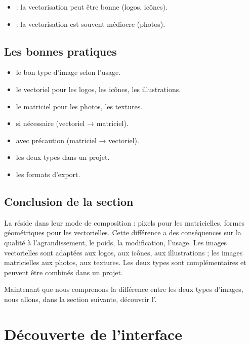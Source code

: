 \begin{itemize}
    \item {} : la vectorisation peut être bonne (logos, icônes).
    \item {} : la vectorisation est souvent médiocre (photos).
\end{itemize}

\subsection{Les bonnes pratiques}

\begin{itemize}
    \item {} le bon type d'image selon l'usage.
    \item {} le vectoriel pour les logos, les icônes, les illustrations.
    \item {} le matriciel pour les photos, les textures.
    \item {} si nécessaire (vectoriel → matriciel).
    \item {} avec précaution (matriciel → vectoriel).
    \item {} les deux types dans un projet.
    \item {} les formats d'export.
\end{itemize}

\subsection*{Conclusion de la section}

La  réside dans leur mode de composition : pixels pour les matricielles, formes géométriques pour les vectorielles. Cette différence a des conséquences sur la qualité à l'agrandissement, le poids, la modification, l'usage. Les images vectorielles sont adaptées aux logos, aux icônes, aux illustrations ; les images matricielles aux photos, aux textures. Les deux types sont complémentaires et peuvent être combinés dans un projet.

Maintenant que nous comprenons la différence entre les deux types d'images, nous allons, dans la section suivante, découvrir l'.

\section{Découverte de l'interface}

